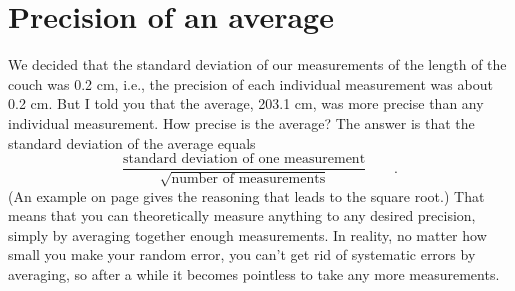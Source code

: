 \section*{Precision of an average}\label{precision-of-average}
	We decided that the standard deviation of our measurements
of the length of the couch was 0.2 cm, i.e., the precision of
each individual measurement was about 0.2 cm. But I told you
that the average, 203.1 cm, was more precise than any
individual measurement. How precise is the average? The answer is
that the standard deviation of the average equals
\begin{equation*}
	\frac{\text{standard deviation of one measurement}}{\sqrt{\text{number of measurements}}}
		\qquad .
\end{equation*}
(An example on page \pageref{eg:average} gives the reasoning that leads to the square root.)
That means that you can theoretically measure anything to
any desired precision, simply by averaging together enough
measurements. In reality, no matter how small you make your
random error, you can't get rid of systematic errors by
averaging, so after a while it becomes pointless to take
any more measurements.
